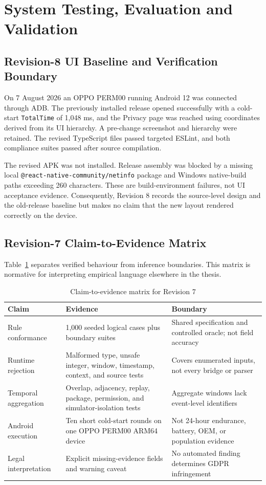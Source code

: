 \newpage
\section{System Testing, Evaluation and Validation}

\subsection{Revision-8 UI Baseline and Verification Boundary}

On 7 August 2026 an OPPO PERM00 running Android 12 was connected through ADB. The previously installed release opened successfully with a cold-start \texttt{TotalTime} of 1,048 ms, and the Privacy page was reached using coordinates derived from its UI hierarchy. A pre-change screenshot and hierarchy were retained. The revised TypeScript files passed targeted ESLint, and both compliance suites passed after source compilation.

The revised APK was not installed. Release assembly was blocked by a missing local \texttt{@react-native-community/netinfo} package and Windows native-build paths exceeding 260 characters. These are build-environment failures, not UI acceptance evidence. Consequently, Revision 8 records the source-level design and the old-release baseline but makes no claim that the new layout rendered correctly on the device.

\subsection{Revision-7 Claim-to-Evidence Matrix}

Table~\ref{tab:claim-evidence-r7} separates verified behaviour from inference boundaries. This matrix is normative for interpreting empirical language elsewhere in the thesis.

\begin{table}[H]
\centering
\small
\caption{Claim-to-evidence matrix for Revision 7}
\label{tab:claim-evidence-r7}
\begin{tabular}{p{}p{}p{}}
\toprule
Claim & Evidence & Boundary \\
\midrule
Rule conformance & 1,000 seeded logical cases plus boundary suites & Shared specification and controlled oracle; not field accuracy \\
Runtime rejection & Malformed type, unsafe integer, window, timestamp, context, and source tests & Covers enumerated inputs, not every bridge or parser \\
Temporal aggregation & Overlap, adjacency, replay, package, permission, and simulator-isolation tests & Aggregate windows lack event-level identifiers \\
Android execution & Ten short cold-start rounds on one OPPO PERM00 ARM64 device & Not 24-hour endurance, battery, OEM, or population evidence \\
Legal interpretation & Explicit missing-evidence fields and warning caveat & No automated finding determines GDPR infringement \\
\bottomrule
\end{tabular}
\end{table}

